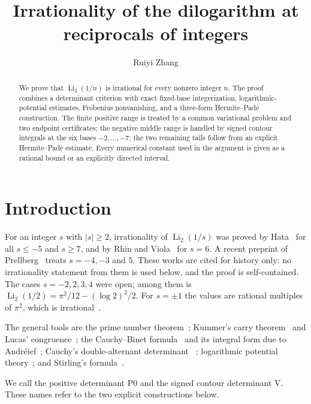 \documentclass{amsart}
\numberwithin{equation}{section}
\numberwithin{table}{section}
\newcommand{\Li}{\operatorname{Li}}
\begin{document}
\title[Reciprocal dilogarithms]{Irrationality of the dilogarithm at reciprocals of integers}
\author{Ruiyi Zhang}
\address{Independent Researcher, Columbia, Maryland, USA}

\begin{abstract}
We prove that \(\Li_2(1/n)\) is irrational for every nonzero integer \(n\).
The proof combines a determinant criterion with exact fixed-base
integerization, logarithmic-potential estimates, Frobenius nonvanishing, and a
three-form Hermite--Pad\'e construction.  The finite positive range is treated
by a common variational problem and two endpoint certificates; the negative
middle range is handled by signed contour integrals at the six bases
\(-2,\ldots,-7\); the two remaining tails follow from an explicit
Hermite--Pad\'e estimate.  Every numerical constant used in the argument is
given as a rational bound or an explicitly directed interval.
\end{abstract}
\maketitle

\section{Introduction}
For an integer $s$ with $|s|\ge2$, irrationality of $\Li_2(1/s)$ was proved
by Hata~\cite{Hata} for all $s\le-5$ and $s\ge7$, and by Rhin and
Viola~\cite{RhinViola} for $s=6$.  A recent preprint of
Prellberg~\cite{Prellberg} treats $s=-4,-3$ and $5$.  These works are cited
for history only: no irrationality statement from them is used below, and
the proof is self-contained.  The cases $s=-2,2,3,4$ were open; among them
is $\Li_2(1/2)=\pi^2/12-(\log2)^2/2$.  For $s=\pm1$ the values are rational
multiples of $\pi^2$, which is irrational~\cite{Legendre}.

The general tools are the prime number theorem~\cite{Davenport}; Kummer's
carry theorem~\cite{Kummer} and Lucas' congruence~\cite{Lucas}; the
Cauchy--Binet formula~\cite{Gantmacher} and its integral form due to
Andr\'eief~\cite{Andreief,Forrester}; Cauchy's double-alternant determinant
~\cite{Krattenthaler}; logarithmic potential theory~\cite{SaffTotik}; and
Stirling's formula~\cite{WhittakerWatson}.

We call the positive determinant P0 and the signed contour
determinant V.  These names refer to the two explicit constructions below.
\end{document}
